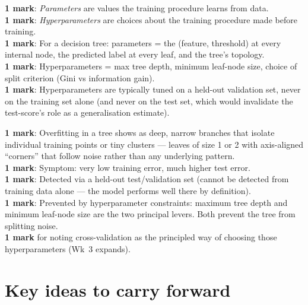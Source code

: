 \documentclass[11pt, a4paper]{article}
\begin{document}
\begin{exambox}
\textbf{1 mark}: \emph{Parameters} are values the training procedure learns from data. \\
\textbf{1 mark}: \emph{Hyperparameters} are choices about the training procedure made before training. \\
\textbf{1 mark}: For a decision tree: parameters = the (feature, threshold) at every internal node, the predicted label at every leaf, and the tree's topology. \\
\textbf{1 mark}: Hyperparameters = max tree depth, minimum leaf-node size, choice of split criterion (Gini vs information gain). \\
\textbf{1 mark}: Hyperparameters are typically tuned on a held-out validation set, never on the training set alone (and never on the test set, which would invalidate the test-score's role as a generalisation estimate).
\end{exambox}

\begin{exambox}
\textbf{1 mark}: Overfitting in a tree shows as deep, narrow branches that isolate individual training points or tiny clusters — leaves of size 1 or 2 with axis-aligned ``corners'' that follow noise rather than any underlying pattern. \\
\textbf{1 mark}: Symptom: very low training error, much higher test error. \\
\textbf{1 mark}: Detected via a held-out test/validation set (cannot be detected from training data alone — the model performs well there by definition). \\
\textbf{1 mark}: Prevented by hyperparameter constraints: maximum tree depth and minimum leaf-node size are the two principal levers. Both prevent the tree from splitting noise. \\
\textbf{1 mark} for noting cross-validation as the principled way of choosing those hyperparameters (Wk~3 expands).
\end{exambox}

\section*{Key ideas to carry forward}
\end{document}
